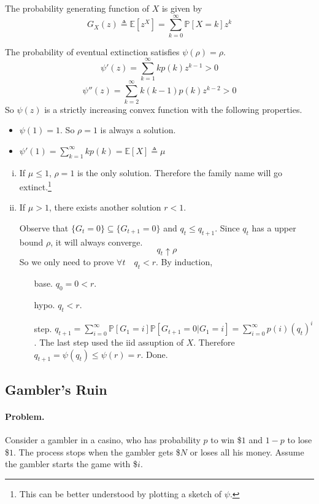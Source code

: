     \begin{definition}
        The probability generating function of $X$ is given by
        \[ G_X(z) \triangleq \mathbb{E}[z^X] = \sum_{k=0}^{\infty}\mathbb{P}[X=k]z^k \]
    \end{definition}

    The probability of eventual extinction satisfies $\psi(\rho) = \rho$.
    \[ \psi'(z) = \sum_{k=1}^{\infty}kp(k)z^{k-1} > 0\]
    \[ \psi''(z) = \sum_{k=2}^{\infty}k(k-1)p(k)z^{k-2} > 0 \]
    So $\psi(z)$ is a strictly increasing convex function with the following properties.
    \begin{itemize}
        \item $\psi(1) = 1$. So $\rho = 1$ is always a solution.
        \item $\psi'(1) = \sum_{k=1}^{\infty}kp(k) = \mathbb{E}[X] \triangleq \mu$
    \end{itemize}
    \begin{enumerate}[(i)]
        \item If $\mu \le 1$, $\rho = 1$ is the only solution. Therefore the family name will go extinct.\footnote{This can be better understood by plotting a sketch of $\psi$.}
        \item If $\mu > 1$, there exists another solution $r<1$.
        
        Observe that $\{ G_t = 0 \} \subseteq \{ G_{t+1} = 0 \}$ and $q_t \le q_{t+1}$. Since $q_t$ has a upper bound $\rho$, it will always converge.
        \[ q_t \uparrow \rho \]
        So we only need to prove $\forall t \quad q_t < r$. By induction,
        \begin{itemize}
            \item[base.] $q_0 = 0 < r$.
            \item[hypo.] $q_t < r$.
            \item[step.] $q_{t+1} = \sum_{i=0}^{\infty}\mathbb{P}[G_1 = i]\mathbb{P}[G_{t+1} = 0| G_1 = i] = \sum_{i=0}^{\infty}p(i)(q_t)^i$. The last step used the iid assuption of $X$. 
            Therefore $q_{t+1} = \psi(q_t) \le \psi(r) = r$. Done.
        \end{itemize} 
    \end{enumerate}

    \subsection{Gambler's Ruin}\label{GamblerRuin}
    \paragraph*{Problem.} Consider a gambler in a casino, who has probability $p$ to win \$$1$ and $1-p$ to lose \$$1$. The process stops when the gambler gets \$$N$ or loses all his money. Assume the gambler starts the game with \$$i$.
